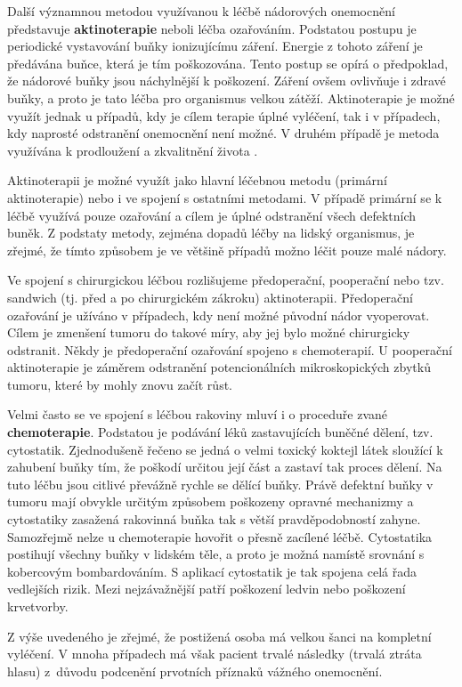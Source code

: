 Další významnou metodou využívanou k léčbě nádorových onemocnění představuje
\textbf{aktinoterapie} neboli léčba ozařováním. Podstatou postupu je
periodické vystavování buňky ionizujícímu záření. Energie z tohoto záření je
předávána buňce, která je tím poškozována. Tento postup se opírá o předpoklad,
že nádorové buňky jsou náchylnější k poškození. Záření ovšem ovlivňuje i
zdravé buňky, a proto je tato léčba pro organismus velkou zátěží.
Aktinoterapie je možné využít jednak u případů, kdy je cílem terapie úplné
vyléčení, tak i v případech, kdy naprosté odstranění onemocnění není možné. V
druhém případě je metoda využívána k prodloužení a zkvalitnění života
\cite{Slavicek2000}.

Aktinoterapii je možné využít jako hlavní léčebnou metodu (primární
aktinoterapie) nebo i ve spojení s ostatními metodami. V případě primární se k
léčbě využívá pouze ozařování a cílem je úplné odstranění všech defektních
buněk. Z podstaty metody, zejména dopadů léčby na lidský organismus, je
zřejmé, že tímto způsobem je ve většině případů možno léčit pouze malé nádory.

Ve spojení s chirurgickou léčbou rozlišujeme předoperační, pooperační nebo
tzv. sandwich (tj. před a po chirurgickém zákroku) aktinoterapii. Předoperační
ozařování je užíváno v případech, kdy není možné původní nádor vyoperovat.
Cílem je zmenšení tumoru do takové míry, aby jej bylo možné chirurgicky
odstranit. Někdy je předoperační ozařování spojeno s chemoterapií.
U pooperační aktinoterapie je záměrem odstranění potencionálních
mikroskopických zbytků tumoru, které by mohly znovu začít růst.


Velmi často se ve spojení s léčbou rakoviny mluví i o proceduře zvané
\textbf{chemoterapie}. Podstatou je podávání léků zastavujících buněčné
dělení, tzv. cytostatik. Zjednodušeně řečeno se jedná o velmi toxický koktejl
látek sloužící k zahubení buňky tím, že poškodí určitou její část a zastaví
tak proces dělení. Na tuto léčbu jsou citlivé převážně rychle se dělící buňky.
Právě defektní buňky v tumoru mají obvykle určitým způsobem poškozeny opravné
mechanizmy a cytostatiky zasažená rakovinná buňka tak s větší pravděpodobností
zahyne. Samozřejmě nelze u chemoterapie hovořit o přesně zacílené léčbě.
Cytostatika postihují všechny buňky v lidském těle, a proto je možná namístě
srovnání s kobercovým bombardováním. S aplikací cytostatik je tak
spojena celá řada vedlejších rizik. Mezi nejzávažnější patří poškození ledvin
nebo poškození krvetvorby.


Z výše uvedeného je zřejmé, že postižená osoba má velkou šanci na kompletní
vyléčení. V mnoha případech má však pacient trvalé následky (trvalá ztráta
hlasu) z~důvodu podcenění prvotních příznaků vážného onemocnění.



